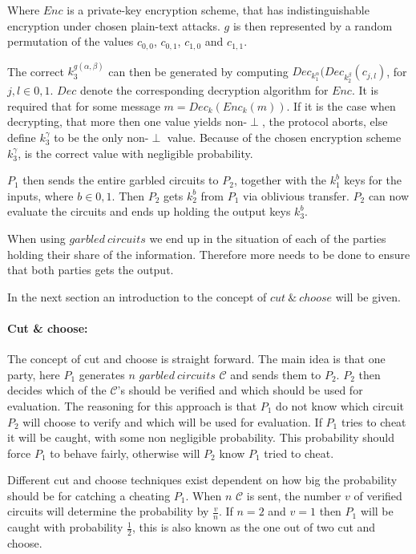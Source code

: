 \documentclass[twoside,11pt,openright]{report}
\begin{document}
Where $Enc$ is a private-key encryption scheme, that has indistinguishable encryption under chosen plain-text attacks. $g$ is then represented by a random permutation of the values $c_{0,0}$, $c_{0,1}$, $c_{1,0}$ and $c_{1,1}$.

The correct $k^{g(\alpha,\beta)}_3$ can then be generated by computing $Dec_{k^\alpha_1}(Dec_{k^\beta_2}(c_{j,l})$, for $j,l\in{0,1}$. $Dec$ denote the corresponding decryption algorithm for $Enc$. It is required that for some message $m=Dec_k(Enc_k(m))$. If it is the case when decrypting, that more then one value yields non-$\perp$, the protocol aborts, else define $k^\gamma_3$ to be the only non-$\perp$ value. Because of the chosen encryption scheme $k^\gamma_3$, is the correct value with negligible probability.

$P_1$ then sends the entire garbled circuits to $P_2$, together with the $k^b_1$ keys for the inputs, where $b\in{0,1}$. Then $P_2$ gets $k^b_2$ from $P_1$ via oblivious transfer. $P_2$ can now evaluate the circuits and ends up holding the output keys $k^b_3$.

When using $garbled~circuits$ we end up in the situation of each of the parties holding their share of the information. Therefore more needs to be done to ensure that both parties gets the output.

\bigskip

In the next section an introduction to the concept of $cut~\&~choose$ will be given.

\paragraph{Cut \& choose:}
The concept of cut and choose is straight forward. The main idea is that one party, here $P_1$ generates $n$ $garbled~circuits$ $\mathcal{C}$ and sends them to $P_2$. $P_2$ then decides which of the $\mathcal{C}$'s should be verified and which should be used for evaluation. The reasoning for this approach is that $P_1$ do not know which circuit $P_2$ will choose to verify and which will be used for evaluation. If $P_1$ tries to cheat it will be caught, with some non negligible probability. This probability should force $P_1$ to behave fairly, otherwise will $P_2$ know $P_1$ tried to cheat.

Different cut and choose techniques exist dependent on how big the probability should be for catching a cheating $P_1$. When $n$ $\mathcal{C}$ is sent, the number $v$ of verified circuits will determine the probability by $\frac{v}{n}$. If $n=2$ and $v=1$ then $P_1$ will be caught with probability $\frac{1}{2}$, this is also known as the one out of two cut and choose.
\end{document}
